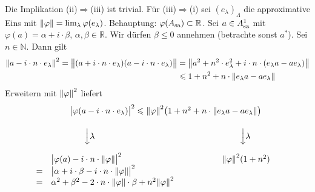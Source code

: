 \begin{beweis}
	Die Implikation (ii)$\Rightarrow$(iii) ist trivial. 
	Für (iii)$\Rightarrow$(i) sei $(e_\lambda)_\Lambda$ die approximative Eins mit $\norm*{\varphi}= \lim_\lambda \varphi(e_\lambda)$.
	Behauptung: $\varphi(A_\sa) \subset \mathbb{R}$. Sei $a \in A_\sa^1$ mit $\varphi(a) = \alpha + i \cdot \beta$, $\alpha,\beta \in \mathbb{R}$. 
	Wir dürfen $\beta \le 0$ annehmen (betrachte sonst $a^*$). 
	Sei $n \in \mathbb{N}$. Dann gilt 
	\begin{align}
		\norm*{a- i \cdot n \cdot e_\lambda}^2 = \norm[\big]{(a+ i \cdot n \cdot e_\lambda)(a- i \cdot n \cdot e_\lambda)} &= \norm*{a^2 +n^2 \cdot e_\lambda^2 + i \cdot n \cdot \enbrace*{e_\lambda a - a e_\lambda}} \\
		&\le 1+ n^2 + n \cdot \norm*{e_\lambda a - a e_\lambda}
	\end{align}
	Erweitern mit $\norm*{\varphi}^2$ liefert
	\[
		\begin{array}{rlccl}
			&& \mbox{}\hspace{-2em}\mathclap{\abs[\big]{\varphi(a- i \cdot n \cdot e_\lambda)}^2 \le \norm*{\varphi}^2 \enbrace*{1+ n^2 + n \cdot \norm*{e_\lambda a - a e_\lambda}}}\hspace{2cm}\mbox{} && \\
			&\hspace{4em}\rotatebox{270}{\mbox{ }\hspace{.4ex}\ensuremath{\grenzw{\rotatebox{90}{\ensuremath{\lambda}}}}\hspace{1.4ex}\mbox{ }} &&  \rotatebox{270}{\mbox{ }\hspace{.4ex}\ensuremath{\grenzw{\rotatebox{90}{\ensuremath{\lambda}}}}\hspace{1.4ex}\mbox{ }}& \\
			&\abs[\big]{\varphi(a)- i \cdot n \cdot \norm*{\varphi}}^2 && \norm*{\varphi}^2 (1+ n^2) & \\
			=&\abs[\big]{\alpha+ i \cdot \beta - i \cdot n \cdot \norm*{\varphi}}^2 &&& \\
			=&\alpha^2 + \beta^2 - 2 \cdot n \cdot \norm*{\varphi} \cdot \beta + n^2 \norm*{\varphi}^2 &&&
		\end{array}
	\]

\end{beweis}
